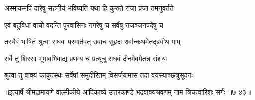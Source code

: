 \twolineshloka
{अस्माकमपि दारेषु सहनीयं भविष्यति}
{यथा हि कुरुते राजा प्रजा तमनुवर्तते} %

\twolineshloka
{एवं बहुविधा वाचो वदन्ति पुरवासिनः}
{नगरेषु च सर्वेषु राजञ्जनपदेषु च} %

\twolineshloka
{तस्यैवं भाषितं श्रुत्वा राघवः परमार्तवत्}
{उवाच सुहृदः सर्वान्कथमेतद्ब्रवीथ माम्} %

\twolineshloka
{सर्वे तु शिरसा भूमावभिवाद्य प्रणम्य च}
{प्रत्यूचू राघवं दीनमेवमेतन्न संशयः} %

\twolineshloka
{श्रुत्वा तु वाक्यं काकुत्स्थः सर्वेषां समुदीरितम्}
{विसर्जयामास तदा वयस्याञ्छत्रुसूदनः} %


॥इत्यार्षे श्रीमद्रामायणे वाल्मीकीये आदिकाव्ये उत्तरकाण्डे भद्रवाक्यश्रवणम् नाम त्रिचत्वारिशः सर्गः ॥७-४३॥
